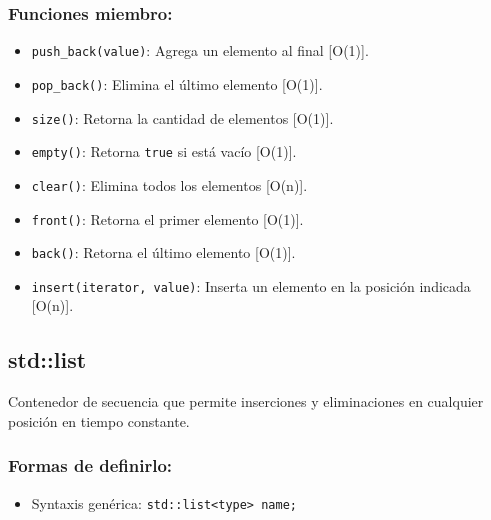\subsubsection{Funciones miembro:}
\begin{itemize}
  \item \texttt{push\_back(value)}: Agrega un elemento al final [O(1)].
  \item \texttt{pop\_back()}: Elimina el último elemento [O(1)].
  \item \texttt{size()}: Retorna la cantidad de elementos [O(1)].
  \item \texttt{empty()}: Retorna \texttt{true} si está vacío [O(1)].
  \item \texttt{clear()}: Elimina todos los elementos [O(n)].
  \item \texttt{front()}: Retorna el primer elemento [O(1)].
  \item \texttt{back()}: Retorna el último elemento [O(1)].
  \item \texttt{insert(iterator, value)}: Inserta un elemento en la posición indicada [O(n)].
\end{itemize}

\subsection{std::list}
\label{subsec:std_list}
Contenedor de secuencia que permite inserciones y eliminaciones en cualquier posición en tiempo constante. 

\subsubsection{Formas de definirlo:}
\begin{itemize}
  \item Syntaxis genérica: \texttt{std::list<type> name;}
\end{itemize}

